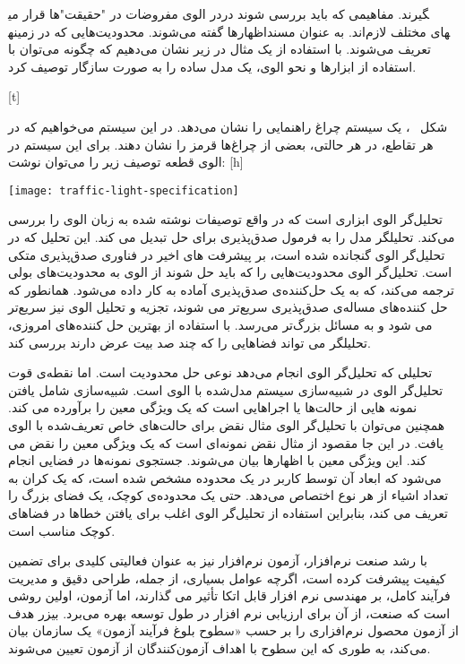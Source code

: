 در الوی مفروضات در "حقیقت‌"ها قرار می‎گیرند. مفاهیمی که باید بررسی شوند در اظهارها گفته می‌شوند. محدودیت‌هایی که در زمینه‎های مختلف لازم‌اند. به عنوان مسند تعریف می‌شوند.
با استفاده از یک مثال در زیر نشان می‌دهیم که چگونه می‌توان با استفاده از ابزارها و نحو الوی، یک مدل ساده را به صورت سازگار توصیف کرد.

[t]
\vspace{0.5em}

شکل ~، یک سیستم چراغ راهنمایی را نشان می‌دهد. در این سیستم می‌خواهیم که در هر تقاطع، در هر حالتی، بعضی از چراغ‌ها قرمز را نشان دهند. برای این سیستم در الوی قطعه توصیف زیر را می‌توان نوشت:
[h]
\raggedright
\texttt{[image: traffic-light-specification]}
\vspace{0.05em}




تحلیل‌گر الوی ابزاری است که در واقع توصیفات نوشته شده به زبان الوی را بررسی می‌کند. تحلیلگر مدل را به فرمول صدق‌پذیری برای حل تبدیل می کند. این تحلیل که در تحلیل‌گر الوی گنجانده شده است، بر پیشرفت های اخیر در فناوری صدق‌پذیری متکی است. تحلیل‌گر الوی محدودیت‌هایی را که باید حل شوند از الوی به محدودیت‌های بولی ترجمه می‌کند، که به یک حل‌کننده‌ی صدق‌پذیری آماده به کار داده می‌شود. همانطور که حل کننده‌های مساله‌ی صدق‌پذیری سریع‌تر می شوند، تجزیه و تحلیل الوی نیز سریع‌تر می شود و به مسائل بزرگ‌تر می‌رسد. با استفاده از بهترین حل کننده‌های امروزی، تحلیلگر می تواند فضاهایی را که چند صد بیت عرض دارند بررسی کند.

تحلیلی که تحلیل‌گر الوی انجام می‌دهد نوعی حل محدودیت است. اما نقطه‌ی قوت تحلیل‌گر الوی در شبیه‌سازی سیستم مدل‌شده با الوی است. شبیه‌سازی شامل یافتن نمونه هایی از حالت‌ها یا اجراهایی است که یک ویژگی معین را برآورده می کند. همچنین می‌توان با تحلیل‌گر الوی مثال نقض برای حالت‌های خاص تعریف‌شده با الوی یافت. در این جا مقصود از مثال نقض نمونه‌ای است که یک ویژگی معین را نقض می کند. این ویژگی معین با اظهارها بیان می‌شوند. جستجوی نمونه‌ها در فضایی انجام می‌شود که ابعاد آن توسط کاربر در یک محدوده مشخص شده است، که یک کران به تعداد اشیاء از هر نوع اختصاص می‌دهد. حتی یک محدوده‌ی کوچک، یک فضای بزرگ را تعریف می کند، بنابراین استفاده از تحلیل‌گر الوی اغلب برای یافتن خطاها در فضاهای کوچک مناسب است.

با رشد صنعت نرم‌افزار، آزمون نرم‌افزار نیز به عنوان فعالیتی کلیدی برای تضمین کیفیت پیشرفت کرده است، اگرچه عوامل بسیاری، از جمله، طراحی دقیق و مدیریت فرآیند کامل، بر مهندسی نرم افزار قابل اتکا تأثیر می گذارند، اما آزمون، اولین روشی است که صنعت، از آن برای ارزیابی نرم افزار در طول توسعه بهره می‌برد. بیزر هدف از آزمون محصول نرم‌افزاری را بر حسب «سطوح بلوغ فرآیند آزمون» یک سازمان بیان می‌کند، به طوری که این سطوح با اهداف آزمون‌کنندگان از آزمون تعیین می‌شوند.

